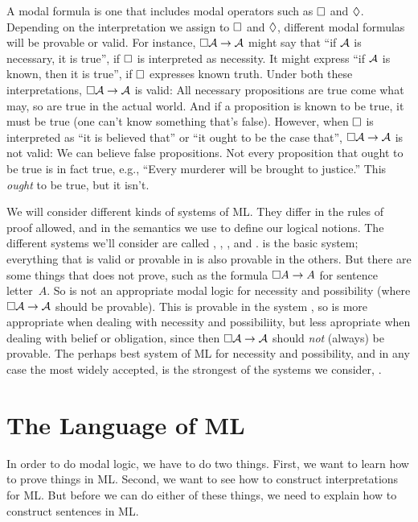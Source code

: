 A modal formula is one that includes modal operators such as $\Box$ and $\Diamond$. Depending on the interpretation we assign to $\Box$ and $\Diamond$, different modal formulas will be provable or valid. For instance, $\Box \mathcal{A} \rightarrow \mathcal{A}$ might say that ``if $\mathcal{A}$ is necessary, it is true'', if $\Box$ is interpreted as necessity. It might express ``if $\mathcal{A}$ is known, then it is true'', if $\Box$ expresses known truth. Under both these interpretations, $\Box\mathcal{A} \rightarrow \mathcal{A}$ is valid: All necessary propositions are true come what may, so are true in the actual world. And if a proposition is known to be true, it must be true (one can't know something that's false). However, when $\Box$ is interpreted as ``it is believed that'' or ``it ought to be the case that'', $\Box\mathcal{A} \rightarrow \mathcal{A}$ is not valid: We can believe false propositions. Not every proposition that ought to be true is in fact true, e.g., ``Every murderer will be brought to justice.'' This \emph{ought} to be true, but it isn't.

We will consider different kinds of systems of ML. They differ in the rules of proof allowed, and in the semantics we use to define our logical notions. The different systems we'll consider are called \mlK, \mlT, \mlSfour, and \mlSfive. \mlK{} is the basic system; everything that is valid or provable in \mlK{} is also provable in the others. But there are some things that \mlK{} does not prove, such as the formula $\Box A \rightarrow A$ for sentence letter~$A$. So \mlK{} is not an appropriate modal logic for necessity and possibility (where $\Box\mathcal{A} \rightarrow \mathcal{A}$ should be provable). This is provable in the system \mlT, so \mlT{} is more appropriate when dealing with necessity and possibiliity, but less apropriate when dealing with belief or obligation, since then $\Box\mathcal{A} \rightarrow \mathcal{A}$ should \emph{not} (always) be provable. The perhaps best system of ML for necessity and possibility, and in any case the most widely accepted, is the strongest of the systems we consider, \mlSfive.

\section{The Language of ML}
\label{TFLtoML}

In order to do modal logic, we have to do two things. First, we want to learn how to prove things in ML. Second, we want to see how to construct interpretations for ML. But before we can do either of these things, we need to explain how to construct sentences in ML.

